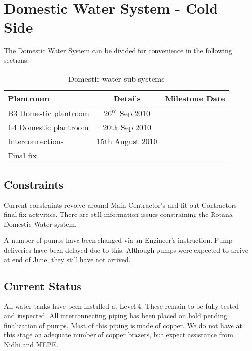 \chapter{Domestic Water System - Cold Side}

The Domestic Water System can be divided for convenience in the following sections. 

\begin{center}
           \begin{table} 
	    \begin{tabular}{lcl}
	      \toprule
	      Plantroom   &  Details & Milestone Date  \\
	      \midrule
	      B3 Domestic plantroom        &  $26^{th}$ Sep 2010  \\
	      L4 Domestic plantroom      &  20th Sep 2010  \\
	      Interconnections    &    15th August 2010  \\
	      Final fix  && \\ 
	      \bottomrule
	    \end{tabular}
           \caption{Domestic water sub-systems}
            \end{table}
   \end{center}

\section{Constraints}
Current constraints revolve around Main Contractor's and fit-out Contractors final fix activities. There are still information issues constraining the Rotana Domestic Water system. 

A number of pumps have been changed via an Engineer's instruction. Pump deliveries have been delayed due to this. Although pumps were expected to arrive at end of June, they still have not arrived. 


\section{Current Status}

All water tanks have been installed at Level 4. These remain to be fully tested and inspected. All interconnecting piping has been placed on hold pending finalization of pumps. Most of this piping is made of copper. We do not have at this stage an adequate number of copper brazers, but expect assistance from Nidhi and MEPE.